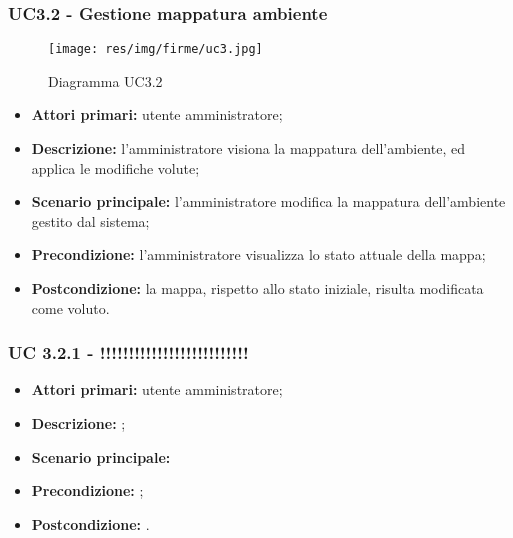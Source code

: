 \subsubsection{UC3.2 - Gestione mappatura ambiente}
	\begin{center}
		\begin{figure}[h!]
			\texttt{[image: res/img/firme/uc3.jpg]}
			\caption{Diagramma UC3.2}
		\end{figure}
	\end{center}
	\begin{itemize}
		\item \textbf{Attori primari:} utente amministratore;
		\item \textbf{Descrizione:} l'amministratore visiona la mappatura dell'ambiente, ed applica le modifiche volute;
		\item \textbf{Scenario principale:} l'amministratore modifica la mappatura dell'ambiente gestito dal sistema;
		\item \textbf{Precondizione:} l'amministratore visualizza lo stato attuale della mappa;
		\item \textbf{Postcondizione:} la mappa, rispetto allo stato iniziale, risulta modificata come voluto.
	\end{itemize}

\subsubsection{UC 3.2.1 - !!!!!!!!!!!!!!!!!!!!!!!!!!}
\begin{itemize}
	\item \textbf{Attori primari:} utente amministratore;
	\item \textbf{Descrizione:} ;
	\item \textbf{Scenario principale:} 
	\item \textbf{Precondizione:} ;
	\item \textbf{Postcondizione:} .
\end{itemize}

